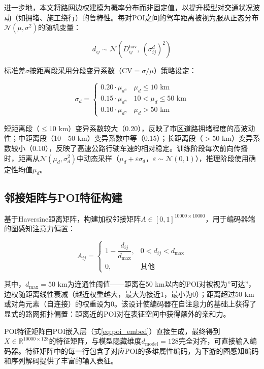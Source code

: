 \documentclass[12pt,a4paper]{ctexart}
\begin{document}
进一步地，本文将路网边权建模为概率分布而非固定值，以提升模型对交通状况波动（如拥堵、施工绕行）的鲁棒性。每对POI之间的驾车距离被视为服从正态分布$\mathcal{N}(\mu,\sigma^2)$的随机变量：

\begin{equation}
d_{ij}\sim\mathcal{N}\!\left(D_{ij}^{\text{hav}},\ (\sigma_{ij}^d)^2\right)
\label{eq:prob_dist}
\end{equation}

标准差$\sigma$按距离段采用分段变异系数（CV$=\sigma/\mu$）策略设定：

\begin{equation}
\sigma_d=\begin{cases}
0.20\cdot\mu_d, & \mu_d\leq 10\text{ km} \\
0.15\cdot\mu_d, & 10<\mu_d\leq 50\text{ km} \\
0.10\cdot\mu_d, & \mu_d>50\text{ km}
\end{cases}
\label{eq:sigma}
\end{equation}

短距离段（$\leq 10$ km）变异系数较大（0.20），反映了市区道路拥堵程度的高波动性；中距离段（10—50 km）变异系数中等（0.15）；长距离段（$>50$ km）变异系数较小（0.10），反映了高速公路行驶车速的相对稳定。训练阶段每次前向传播时，距离从$\mathcal{N}(\mu_d,\sigma_d^2)$中动态采样（$\mu_d+\varepsilon\sigma_d$，$\varepsilon\sim\mathcal{N}(0,1)$），推理阶段使用确定性均值$\mu_d$。

\subsection{邻接矩阵与POI特征构建}

基于Haversine距离矩阵，构建加权邻接矩阵$A\in[0,1]^{10000\times 10000}$，用于编码器端的图感知注意力偏置：

\begin{equation}
A_{ij}=\begin{cases}
1-\dfrac{d_{ij}}{d_{\max}}, & 0<d_{ij}<d_{\max} \\[6pt]
0, & \text{其他}
\end{cases}
\label{eq:adjacency}
\end{equation}

其中，$d_{\max}=50$ km为连通性阈值——距离在50 km以内的POI对被视为”可达”，边权随距离线性衰减（越近权重越大，最大为接近1，最小为0）；距离超过50 km或对角元素（自连接）的权重设为0。该设计使编码器在自注意力的基础上获得了显式的路网拓扑偏置：距离近的POI对在表征空间中获得额外的亲和力。

POI特征矩阵由POI嵌入层（式\ref{eq:poi_embed}）直接生成，最终得到$X\in\mathbb{R}^{10000\times 128}$的特征矩阵，与模型隐藏维度$d_{\text{model}}=128$完全对齐，可直接输入编码器。特征矩阵中的每一行包含了对应POI的多维属性编码，为下游的图感知编码和序列解码提供了丰富的输入表征。
\end{document}
